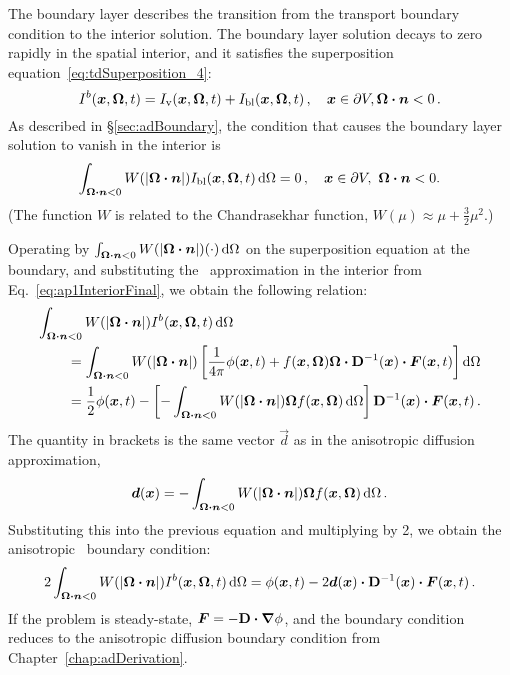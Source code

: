 The boundary layer describes the transition from the transport boundary
condition to the interior solution. The boundary layer solution decays to zero
rapidly in the spatial interior, and it satisfies the superposition
equation~\eqref{eq:tdSuperposition_4}:
\begin{equation*}
  I^b(\bm{x},\bm{\Omega},t)
  = I_\mathrm{v}(\bm{x},\bm{\Omega},t) + I_\mathrm{bl}(\bm{x},\bm{\Omega},t)\,,
  \quad \bm{x}\in \partial V, \bm{\Omega}\bm{\cdot} \bm{n} < 0\,.
\end{equation*}
As described in \S\ref{sec:adBoundary}, the condition that causes the boundary
layer solution to vanish in the interior is 
\begin{equation}\label{eq:tdKillBndy_4}
  \int_{\bm{\Omega}\bm{\cdot}\bm{n} < 0}
  W(\left| \bm{\Omega}\bm{\cdot}\bm{n} \right|) I_\mathrm{bl}(\bm{x},\bm{\Omega},t) \mathop{}\!\mathrm{d}\Omega
  = 0\,,
  \quad \bm{x}\in \partial V ,\ \bm{\Omega}\bm{\cdot} \bm{n} < 0.
\end{equation}
(The function $W$ is related to the Chandrasekhar function, $W(\mu)\approx \mu +
\frac32 \mu^2$.)

Operating by $ \int_{\bm{\Omega}\bm{\cdot}\bm{n} < 0}
W(\left| \bm{\Omega}\bm{\cdot}\bm{n} \right|) (\cdot) \mathop{}\!\mathrm{d}\Omega$ on the superposition
equation at the boundary, and substituting the
\APone\ approximation in the interior from Eq.~\eqref{eq:ap1InteriorFinal}, we
obtain the following relation:
\begin{align*}
  \lefteqn{\int_{\vec{\Omega}\vd\vec{n} < 0}
  W(\abs{\vec{\Omega}\vd\vec{n}}) I^b(\vec{x},\vec{\Omega},t) \ud\Omega}
  \qquad&
  \\
 &= 
 \int_{\vec{\Omega}\vd\vec{n} < 0}
  W(\abs{\vec{\Omega}\vd\vec{n}}) \left[ \frac{1}{4\pi} \phi(\vec{x},t)
  + f(\vec{x},\vec{\Omega}) \vec{\Omega} \vd
  \Dtens\inv(\vec{x}) \vd \vec{F}(\vec{x},t)\right] \ud\Omega
\\
&= \frac{1}{2} \phi(\vec{x},t)
-  \left[ - \int_{\vec{\Omega}\vd\vec{n} < 0} W(\abs{\vec{\Omega}\vd\vec{n}})
  \vec{\Omega} f(\vec{x},\vec{\Omega}) \ud\Omega\right]
 \Dtens\inv(\vec{x}) \vd \vec{F}(\vec{x},t) \,.
\end{align*}
The quantity in brackets is the same vector $\vec{d}$ as in the anisotropic
diffusion approximation,
\begin{equation} \label{eq:adBoundaryIntegral2_4}
  \bm{d}(\bm{x}) = -\int_{\bm{\Omega}\bm{\cdot}\bm{n} < 0} W(\left| \bm{\Omega}\bm{\cdot}\bm{n} \right|)
\bm{\Omega} f(\bm{x}, \bm{\Omega}) \mathop{}\!\mathrm{d}\Omega\,.
\end{equation}
Substituting this into the previous equation and multiplying by 2, we obtain
the anisotropic \Pone\ boundary condition:
\begin{equation} \label{eq:ap1BoundaryCondition}
  2 \int_{\bm{\Omega}\bm{\cdot}\bm{n} < 0}
  W(\left| \bm{\Omega}\bm{\cdot}\bm{n} \right|) I^b(\bm{x},\bm{\Omega},t) \mathop{}\!\mathrm{d}\Omega
  = \phi(\bm{x},t)
  - 2 \bm{d}(\bm{x}) \bm{\cdot} \mathbf{D}^{-1}(\bm{x}) \bm{\cdot} \bm{F}(\bm{x},t) \,.
\end{equation}
If the problem is steady-state, $\bm{F} = - \mathbf{D} \bm{\cdot} \bm{\nabla} \phi$, and the
boundary condition reduces to the anisotropic diffusion boundary condition from
Chapter~\ref{chap:adDerivation}.


